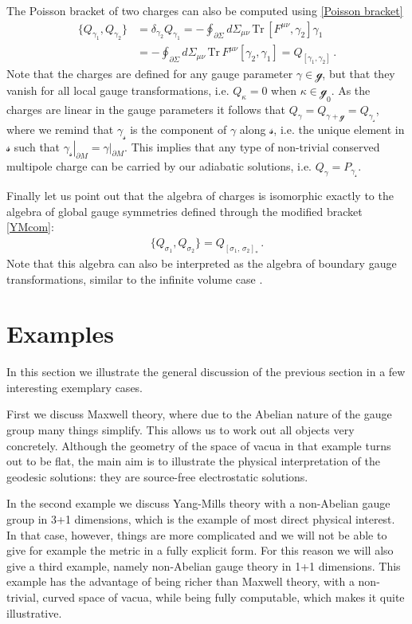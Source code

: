 \documentclass[11pt,a4paper]{article}
\def\calsg{{\boldsymbol{\mathscr g}}}
\def\calss{{\boldsymbol{\mathscr s}}}
\def\mn{{\mu\nu}}
\def\pd{\partial}
\def\de{\delta}
\def\Tr{\mathrm{Tr}}
\begin{document}
    The Poisson bracket of two charges can also be computed using \eqref{Poisson bracket}
\begin{align}
\nonumber    \{Q_{\gamma_1},Q_{\gamma_2}\}&=\de_{\gamma_2}Q_{\gamma_1}=-\oint_{\pd\Sigma} d\Sigma_\mn\, \Tr\, [F^\mn,\gamma_2] \gamma_1\\
    &=-\oint_{\pd\Sigma} d\Sigma_\mn\, \Tr\, F^\mn [\gamma_2,\gamma_1]=Q_{[\gamma_1,\gamma_2]}\,.
\end{align}
Note that the charges are defined for any gauge parameter $\gamma\in\calsg$, but that they vanish for all local gauge transformations, i.e. $Q_{\kappa}=0$ when $\kappa\in \calsg_0$. As the charges are linear in the gauge parameters it follows that $Q_{\gamma}=Q_{\gamma+\calsg}=Q_{\gamma_\calss}$, where we remind that $\gamma_\calss$ is the component of $\gamma$ along $\calss$, i.e. the unique element in  $\calss$ such that $\left.\gamma_\calss\right|_{\partial M}=\left.\gamma\right|_{\partial M}$. This implies that any type of non-trivial conserved multipole charge can be carried by our adiabatic solutions, i.e. $Q_\gamma=P_{\gamma_\calss}$.
 
Finally let us point out that the algebra of charges is isomorphic exactly to the algebra of global gauge symmetries defined through the modified bracket \eqref{YMcom}:
\begin{align}
    \{Q_{\sigma_1},Q_{\sigma_2}\}=Q_{[\sigma_1,\, \sigma_2]_*}\,.
\end{align}    
Note that this algebra can also be interpreted as the algebra of boundary gauge transformations, similar to the infinite volume case \cite{Strominger:2013lka, Barnich:2013sxa}.    
    
     
    
    \section{Examples}\label{exampsec}
    In this section we illustrate the general discussion of the previous section in a few interesting exemplary cases.
    
    First we discuss Maxwell theory, where due to the Abelian nature of the gauge group many things simplify. This allows us to work out all objects very concretely. Although the geometry of the space of vacua in that example turns out to be flat, the main aim  is to illustrate the physical interpretation of the geodesic solutions: they are source-free electrostatic solutions.
    
     In the second example we discuss Yang-Mills theory with a non-Abelian gauge group in 3+1 dimensions, which is the example of most direct physical interest. In that case, however, things are more complicated and we will not be able to give for example the metric in a fully explicit form. For this reason we will also give a third example, namely non-Abelian gauge theory in 1+1 dimensions. This example has the advantage of being richer than Maxwell theory, with a non-trivial, curved space of vacua, while being fully computable, which makes it quite illustrative.
    
\end{document}
